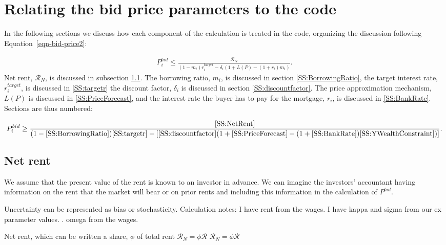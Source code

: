 \chapter{Relating the bid price parameters to the code}

In the following sections we discuss %
how each component of the calculation is treated in the code, organizing the discussion following Equation~\ref{eqn-bid-price2}:


\begin{align}
P_i^{bid} \le   \frac{\mathcal{R}_N}{(1-m_i)r_i^{target}- \delta_i \left(1+L(P)- (1+ r_i)m_i\right)}.
\end{align}
Net rent, $\mathcal{R}_N$, is discussed in subsection \ref{SS:NetRent}. The borrowing ratio, $m_i$, is discussed in section \ref{SS:BorrowingRatio}, the target interest rate, $r_i^{target}$, is discussed in \ref{SS:targetr} the discount factor, $\delta_i$ is discussed in section \ref{SS:discountfactor}. The price approximation mechanism, $L(P)$ is discussed in \ref{SS:PriceForecast}, and the interest rate the buyer has to pay for the mortgage, $r_i$, is discussed in \ref{SS:BankRate}. Sections are thus numbered: 

\begin{align*}
P_i^{bid} \ge   \frac{\ref{SS:NetRent}} {(1-\ref{SS:BorrowingRatio})\ref{SS:targetr}-
\left[ \ref{SS:discountfactor}(1+\ref{SS:PriceForecast}- (1+\ref{SS:BankRate})\ref{SS:YWealthConstraint})\right]}. 
\end{align*}



\section{Net rent}\label{SS:NetRent}
We assume that the present value of the rent %
is known to an investor in advance. We can imagine the investors' accountant having information on the rent that the market will bear or on prior rents and including this information in the calculation of $P^{bid}$.

Uncertainty can be represented as bias or stochasticity.
Calculation notes: I have rent from the wages. I have kappa and sigma from our ex parameter values. . omega from the wages. 

Net rent, which can be written a share, $\phi$ of total rent $\mathcal{R}_N = \phi \mathcal{R}$
$\mathcal{R}_N = \phi \mathcal{R}$

